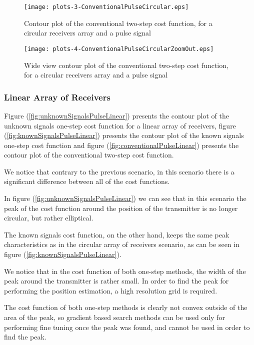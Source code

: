 \begin{figure}
\begin{center}
\texttt{[image: plots-3-ConventionalPulseCircular.eps]} 
\end{center}
\caption{Contour plot of the conventional two-step cost function, for a circular receivers array and a pulse signal}
\label{fig:conventionalPulseCircular}
\end{figure}

\begin{figure}
\begin{center}
\texttt{[image: plots-4-ConventionalPulseCircularZoomOut.eps]} 
\end{center}
\caption{Wide view contour plot of the conventional two-step cost function, for a circular receivers array and a pulse signal}
\label{fig:zoomoutConventionalPulseCircular}
\end{figure}

\subsubsection*{Linear Array of Receivers}
Figure (\ref{fig:unknownSignalsPulseLinear}) presents the contour plot of the unknown signals one-step cost function for a linear array of receivers, figure (\ref{fig:knownSignalsPulseLinear}) presents the contour plot of the known signals one-step cost function and figure (\ref{fig:conventionalPulseLinear}) presents the contour plot of the conventional two-step cost function.

We notice that contrary to the previous scenario, in this scenario there is a significant difference between all of the cost functions.

In figure (\ref{fig:unknownSignalsPulseLinear}) we can see that in this scenario the peak of the cost function around the position of the transmitter is no longer circular, but rather elliptical.

The known signals cost function, on the other hand, keeps the same peak characteristics as in the circular array of receivers scenario, as can be seen in figure (\ref{fig:knownSignalsPulseLinear}).

We notice that in the cost function of both one-step methods, the width of the peak around the transmitter is rather small. In order to find the peak for performing the position estimation, a high resolution grid is required. 

The cost function of both one-step methods is clearly not convex outside of the area of the peak, so gradient based search methods can be used only for performing fine tuning once the peak was found, and cannot be used in order to find the peak.

